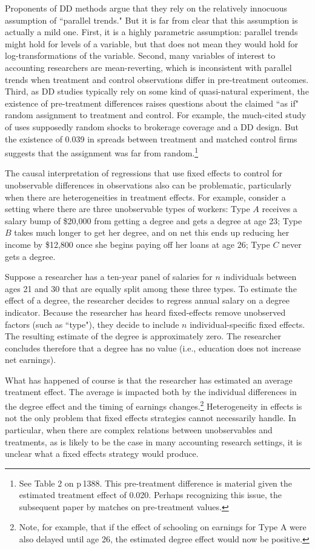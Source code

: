 \documentclass[12pt,reqno,titlepage]{amsart}
\theoremstyle{definition}
\begin{document}
\begin{doublespace}
Proponents of DD methods argue that they rely on the relatively innocuous assumption of ``parallel trends."
But it is far from clear that this assumption is actually a mild one. 
First, it is a highly parametric assumption: parallel trends might hold for levels of a variable, but that does not mean they would hold for log-transformations of the variable.
Second, many variables of interest to accounting researchers are mean-reverting, which is inconsistent with parallel trends when treatment and control observations differ in pre-treatment outcomes.
Third, as DD studies typically rely on some kind of quasi-natural experiment, the existence of pre-treatment differences raises questions about the claimed ``as if" random assignment to treatment and control.
For example, the much-cited study of \cite{Kelly:2012ih} uses supposedly random shocks to brokerage coverage and a DD design.
But the existence of 0.039 in spreads between treatment and matched control firms suggests that the assignment was far from random.\footnote{See Table 2 on p\,1388. This pre-treatment difference is material given the estimated treatment effect of 0.020. Perhaps recognizing this issue, the subsequent paper by \citet{Balakrishnan:2014js} matches on pre-treatment values.}

The causal interpretation of regressions that use fixed effects to control for unobservable differences in observations also can be problematic, particularly when there are heterogeneities in treatment effects.
For example, consider a setting where there are three unobservable types of workers: Type $A$ receives a salary bump of \$20,000 from getting a degree and gets a degree at age 23; Type $B$ takes much longer to get her degree, and on net this ends up reducing her income by \$12,800 once she begins paying off her loans at age 26;
Type $C$ never gets a degree. 

Suppose a researcher has a ten-year panel of salaries for $n$ individuals between ages 21 and 30 that are equally split among these three types. 
To estimate the effect of a degree, 
the researcher decides to regress annual salary on a degree indicator.
Because the researcher has heard fixed-effects remove unobserved
factors (such as ``type"), they decide to include $n$ individual-specific
fixed effects. 
The resulting estimate of the degree is approximately
zero. 
The researcher concludes therefore that a degree has no value (i.e.,
education does not increase net earnings). 

What has happened of course is that the researcher has estimated an average treatment effect. The average is impacted both by the
individual differences in the degree effect and the timing of
earnings changes.\footnote{Note, for example, that if the effect of
schooling on earnings for Type A were also delayed until age 26, the estimated degree effect would now be positive.} Heterogeneity in effects is not the only problem that fixed effects strategies cannot necessarily handle. 
In particular, when there are complex relations between unobservables and treatments, as is likely to be the case in many accounting research settings, it is unclear what a fixed effects strategy would produce.


\end{doublespace}
\end{document}
